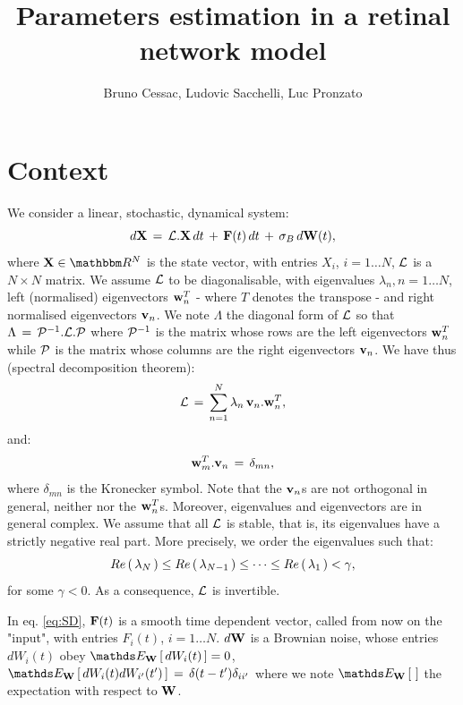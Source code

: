 \documentclass{article}
\title{Parameters estimation in a retinal network model}
\author{
 Bruno Cessac, Ludovic Sacchelli, Luc Pronzato
}
\begin{document}
\setlength\parindent{24pt}

\maketitle

\section{Context}

We consider a linear, stochastic, dynamical system:
%
\begin{equation} \label{eq:SD}
d\bold{X}\,=\,{\mathcal L}.\bold{X} \,dt \,+\,\bold{F}(t) \,dt \,+\, \sigma_B \,d\bold{W}(t),
\end{equation}
%
where $\vX \in \setR^N$ is the state vector, with entries $X_i$, $i=1 \dots N$, ${\mathcal L}$ is a $N \times N$ matrix. We assume ${\mathcal L}$ to be diagonalisable, with eigenvalues
$\lambda_n, n=1 \dots N$, left (normalised) eigenvectors $\bold{w}^T_n$ - where $T$ denotes the transpose - and right normalised eigenvectors $\bold{v}_n$.
We note $\Lambda$ the diagonal form of ${\mathcal L}$ so that $\Lambda\,=\,{\mathcal P}^{-1}.{\mathcal L}.{\mathcal P}$ where ${\mathcal P}^{-1}$ is the matrix whose rows are the
left eigenvectors $\bold{w}^T_n$ while ${\mathcal P}$ is the matrix whose columns are the right eigenvectors $\bold{v}_n$. 
We have thus (spectral decomposition theorem):
%
\begin{equation}\label{eq:SpectralDecomposition}
{\mathcal L}\,=\,\sum_{n=1}^N \lambda_n \, \bold{v}_n.\bold{w}^T_n,
\end{equation} 
%
and:
%
\begin{equation}\label{eq:Orthogonality}
\bold{w}^T_m.\bold{v}_n\,= \, \delta_{mn},
\end{equation}
%
where $\delta_{mn}$ is the Kronecker symbol. Note that the $\bold{v}_n$s are not orthogonal in general, neither nor the $\bold{w}^T_n$s. Moreover, eigenvalues and eigenvectors are in general complex. We assume that all ${\mathcal L}$ is stable, that is, its eigenvalues have a strictly negative real part. More precisely, we order the eigenvalues such that:
%
\begin{equation}\label{eq:OrderEigenvalues}
Re\left(\, \lambda_N \, \right) \leq Re\left(\, \lambda_{N-1} \, \right) \leq \dots \leq Re\left(\, \lambda_1 \, \right) < \gamma,
\end{equation}
%
for some $\gamma < 0$. As a consequence, ${\mathcal L}$ is invertible.

In eq. \eqref{eq:SD}, $\bold{F}(t)$ is a smooth time dependent vector, called from now on the "input", with entries $F_i(t)$, $i=1 \dots N$. $d\bold{W}$ is a Brownian noise, whose entries $dW_{i}(t)$ obey $\Exp{\vW}{dW_{i}(t)}=0$,
$\Exp{\vW}{dW_{i}(t)dW_{i'}(t')}\,=\,\delta(t-t')\delta_{ii'}$ where we note
$\Exp{\vW}{}$ the expectation with respect to $\bold{W}$.\\
\end{document}
